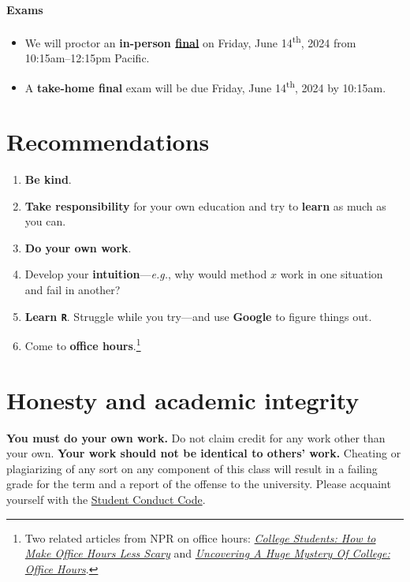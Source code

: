 \documentclass[10pt]{article}
\newcommand{\emf}[1]{\textbf{\textcolor{grass_green}{#1}}}
\begin{document}
\paragraph{Exams}
\begin{itemize}
  \item We will proctor an \emf{in-person \href{https://registrar.uoregon.edu/calendars/examinations}{final}} on Friday, June 14\textsuperscript{th}, 2024 from 10:15am--12:15pm Pacific.
  \item A \emf{take-home final} exam will be due Friday, June 14\textsuperscript{th}, 2024 by 10:15am.
\end{itemize}

\section*{Recommendations}

\begin{enumerate}
  \item \emf{Be kind}.
  \item \emf{Take responsibility} for your own education and try to \emf{learn} as much as you can.
  \item \emf{Do your own work}.
  \item Develop your \emf{intuition}---\textit{e.g.}, why would method $x$ work in one situation and fail in another?
  \item \emf{Learn \texttt{R}}. Struggle while you try---and use \emf{Google} to figure things out.
  \item Come to \emf{office hours}.\footnote{Two related articles from NPR on office hours: \href{https://www.npr.org/2019/10/05/678815966/college-students-how-to-make-office-hours-less-scary}{\textit{College Students: How to Make Office Hours Less Scary}} and \href{https://www.npr.org/2019/10/02/766568824/uncovering-a-huge-mystery-of-college-office-hours}{\textit{Uncovering A Huge Mystery Of College: Office Hours}}.}
\end{enumerate}

\section*{Honesty and academic integrity}

\emf{You must do your own work.} Do not claim credit for any work other than your own. \emf{Your work should not be identical to others' work.} Cheating or plagiarizing of any sort on any component of this class will result in a failing grade for the term and a report of the offense to the university. Please acquaint yourself with the \href{http://studentlife.uoregon.edu}{Student Conduct Code}.
\end{document}
